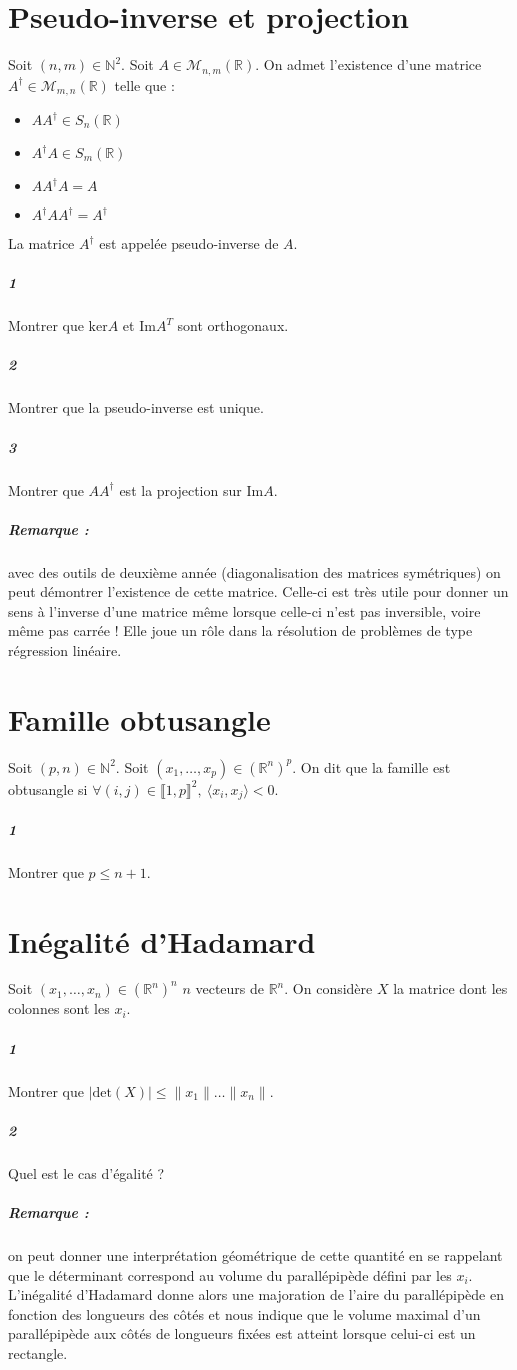 \documentclass[10pt,a4paper]{article}
\begin{document}
\section{Pseudo-inverse et projection}
Soit $(n,m) \in \mathbb{N}^2$. Soit $A \in \mathcal{M}_{n,m} \left( \mathbb{R} \right)$. On admet l'existence d'une matrice $A^{\dag} \in \mathcal{M}_{m,n} \left( \mathbb{R} \right)$ telle que :
\begin{itemize}
\item $AA^{\dag} \in S_n\left( \mathbb{R} \right)$
\item $A^{\dag}A \in S_m \left( \mathbb{R} \right)$
\item $AA^{\dag}A=A$
\item $A^{\dag}AA^{\dag} =A^{\dag}$
\end{itemize}
La matrice $A^{\dag}$ est appelée pseudo-inverse de $A$.
\subparagraph{1}Montrer que $\text{ker}A$ et $\text{Im}A^T$ sont orthogonaux.
\subparagraph{2}Montrer que la pseudo-inverse est unique.
\subparagraph{3}Montrer que $AA^{\dag}$ est la projection sur $\text{Im}A$.

\subparagraph{Remarque :} avec des outils de deuxième année (diagonalisation des matrices symétriques) on peut démontrer l'existence de cette matrice. Celle-ci est très utile pour donner un sens à l'inverse d'une matrice même lorsque celle-ci n'est pas inversible, voire même pas carrée ! Elle joue un rôle dans la résolution de problèmes de type régression linéaire.
\section{Famille obtusangle	}
Soit $(p,n) \in \mathbb{N}^2$. Soit $(x_1, \dots, x_p) \in \left( \mathbb{R}^n \right)^p$. On dit que la famille est obtusangle si $\forall (i,j) \in \llbracket 1,p \rrbracket^2, \ \langle x_i,x_j \rangle <0$.
\subparagraph{1}Montrer que $p \le n+1$.
\section{Inégalité d'Hadamard}
Soit $(x_1, \dots, x_n) \in \left(\mathbb{R}^n \right)^n$ $n$ vecteurs de $\mathbb{R}^n$. On considère $X$ la matrice dont les colonnes sont les $x_i$. 
\subparagraph{1} Montrer que $\vert \text{det}(X) \vert  \le \|x_1\| \dots \| x_n \|$.
\subparagraph{2}Quel est le cas d'égalité ?
\subparagraph{Remarque :} on peut donner une interprétation géométrique de cette quantité en se rappelant que le déterminant correspond au volume du parallépipède défini par les $x_i$. L'inégalité d'Hadamard donne alors une majoration de l'aire du parallépipède en fonction des longueurs des côtés et nous indique que le volume maximal d'un parallépipède aux côtés de longueurs fixées est atteint lorsque celui-ci est un rectangle.
\end{document}
